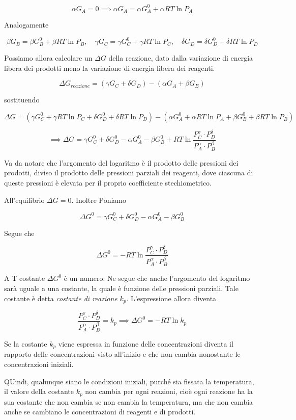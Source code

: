 $$\alpha G_A = 0 \implies \alpha G_A = \alpha G_A^0  + \alpha RT \ln P_A$$

Analogamente

$$\beta G_B = \beta G_B^0  + \beta RT \ln P_B,
\quad
\gamma G_C = \gamma G_C^0  + \gamma RT \ln P_C,
\quad
\delta G_D = \delta G_D^0  + \delta RT \ln P_D$$

Possiamo allora calcolare un $\Delta G$ della reazione, dato dalla variazione di energia libera dei prodotti meno la variazione di energia libera dei reagenti.

$$\Delta G_{reazione} = (\gamma G_C + \delta G_D) - (\alpha G_A + \beta G_B)$$

sostituendo

$$\Delta G = (\gamma G_C^0  + \gamma RT \ln P_C + \delta G_D^0  + \delta RT \ln P_D) - 
(\alpha G_A^0  + \alpha RT \ln P_A + \beta G_B^0  + \beta RT \ln P_B)$$

$$\implies \Delta G = \gamma G_C^0 + \delta G_D^0 - \alpha G_A^0 - \beta G_B^0 + RT \ln \frac{P_C^{\gamma} \cdot P_D^{\delta}}{P_A^{\alpha} \cdot P_B^{\beta}}$$

Va da notare che l'argomento del logaritmo è il prodotto delle pressioni dei prodotti, diviso il prodotto delle pressioni parziali dei reagenti, dove ciascuna di queste pressioni è elevata per il proprio coefficiente stechiometrico.

All'equilibrio $\Delta G = 0$. Inoltre Poniamo

$$\Delta G^0 = \gamma G_C^0 + \delta G_D^0 - \alpha G_A^0 - \beta G_B^0 $$

Segue che

$$\Delta G^0 = -RT \ln \frac{P_C^{\gamma} \cdot P_D^{\delta}}{P_A^{\alpha} \cdot P_B^{\beta}}$$

A T costante $\Delta G^0$ è un numero. Ne segue che anche l'argomento del logaritmo sarà uguale a una costante, la quale è funzione delle pressioni parziali. Tale costante è detta \textit{costante di reazione} $k_p$. L'espressione allora diventa

$$\frac{P_C^{\gamma} \cdot P_D^{\delta}}{P_A^{\alpha} \cdot P_B^{\beta}} = k_p
\implies
\Delta G^0 = -RT\ln k_p$$

Se la costante $k_p$ viene espressa in funzione delle concentrazioni diventa il rapporto delle concentrazioni visto all'inizio e che non cambia nonostante le concentrazioni iniziali.

QUindi, qualunque siano le condizioni iniziali, purché sia fissata la temperatura, il valore della costante $k_p$ non cambia per ogni reazioni, cioè ogni reazione ha la sua costante che non cambia se non cambia la temperatura, ma che non cambia anche se cambiano le concentrazioni di reagenti e di prodotti.

